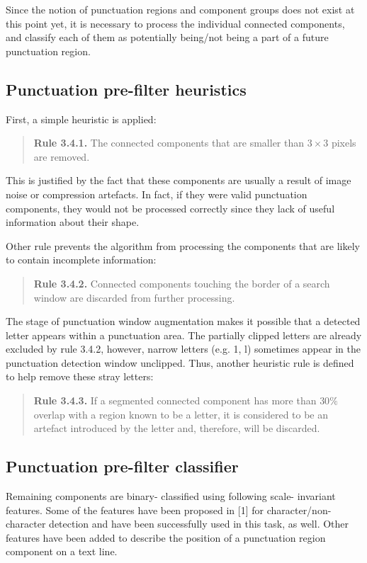 \documentclass[12pt,a4paper]{report}
\begin{document}
Since the notion of punctuation regions and component groups does not exist at this point yet, it is necessary to process the individual connected components, and classify each of them as potentially being/not being a part of a future punctuation region.

\subsection{Punctuation pre-filter heuristics}
First, a simple heuristic is applied:
\begin{quote}
\textbf{Rule 3.4.1.} The connected components that are smaller than $3 \times 3$ pixels are removed.
\end{quote}
This is justified by the fact that these components are usually a result of image noise or compression artefacts. In fact, if they were valid punctuation components, they would not be processed correctly since they lack of useful information about their shape.

Other rule prevents the algorithm from processing the components that are likely to contain incomplete information:
\begin{quote}
\textbf{Rule 3.4.2.} Connected components touching the border of a search window are discarded from further processing.
\end{quote}

The stage of punctuation window augmentation makes it possible that a detected letter appears within a punctuation area. The partially clipped letters are already excluded by rule 3.4.2, however, narrow letters (e.g. 1, l) sometimes appear in the punctuation detection window unclipped. Thus, another heuristic rule is defined to help remove these stray letters:
\begin{quote}
\textbf{Rule 3.4.3.} If a segmented connected component has more than $30\%$ overlap with a region known to be a letter, it is considered to be an artefact introduced by the letter and, therefore, will be discarded.
\end{quote}

\subsection{Punctuation pre-filter classifier}
Remaining components are binary- classified using following scale- invariant features. Some of the features have been proposed in [1] for character/non- character detection and have been successfully used in this task, as well. Other features have been added to describe the position of a punctuation region component on a text line.
\end{document}
